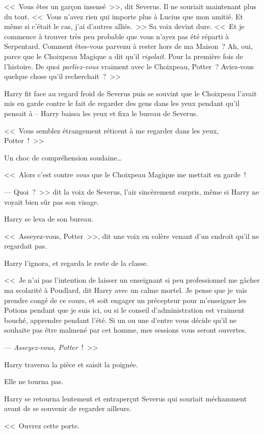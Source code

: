 <<~Vous êtes un garçon insensé~>>, dit Severus. Il ne souriait maintenant plus du tout. <<~Vous n'avez rien qui importe plus à Lucius que mon amitié. Et même si c'était le cas, j'ai d'autres alliés.~>> Sa voix devint dure. <<~Et je commence à trouver très peu probable que vous n'ayez pas été réparti à Serpentard. Comment êtes-vous parvenu à rester hors de ma Maison~? Ah, oui, parce que le Choixpeau Magique a dit qu'il \emph{rigolait}. Pour la première fois de l'histoire. De quoi \emph{parliez-vous} vraiment avec le Choixpeau, Potter~? Aviez-vous quelque chose qu'il recherchait~?~>>

Harry fit face au regard froid de Severus puis se souvint que le Choixpeau l'avait mis en garde contre le fait de regarder des gens dans les yeux pendant qu'il pensait à -- Harry baissa les yeux et fixa le bureau de Severus.

<<~Vous semblez étrangement réticent à me regarder dans les yeux, Potter~!~>>

Un choc de compréhension soudaine…

<<~Alors c'est contre \emph{vous} que le Choixpeau Magique me mettait en garde~!

--- Quoi~?~>> dit la voix de Severus, l'air sincèrement surpris, même si Harry ne voyait bien sûr pas son visage.

Harry se leva de son bureau.

<<~Asseyez-vous, Potter~>>, dit une voix en colère venant d'un endroit qu'il ne regardait pas.

Harry l'ignora, et regarda le reste de la classe.

<<~Je n'ai pas l'intention de laisser un enseignant si peu professionnel me gâcher ma scolarité à Poudlard, dit Harry avec un calme mortel. Je pense que je vais prendre congé de ce cours, et soit engager un précepteur pour m'enseigner les Potions pendant que je suis ici, ou si le conseil d'administration est vraiment bouché, apprendre pendant l'été. Si un ou une d'entre vous décide qu'il ne souhaite pas être malmené par cet homme, mes sessions vous seront ouvertes.

--- \emph{Asseyez-vous, Potter}~!~>>

Harry traversa la pièce et saisit la poignée.

Elle ne tourna pas.

Harry se retourna lentement et entraperçut Severus qui souriait méchamment avant de se souvenir de regarder ailleurs.

<<~Ouvrez cette porte.

